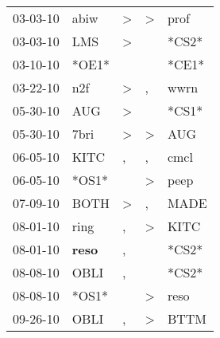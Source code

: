\begin{supertabular}{p{0.07\textwidth}p{0.06\textwidth}p{0.02\textwidth}p{0.02\textwidth}p{0.06\textwidth}}
          03-03-10\textsuperscript{} &           abiw\textsuperscript{} &     \textgreater &     \textgreater &           prof\textsuperscript{} \\
          03-03-10\textsuperscript{} &            LMS\textsuperscript{} &     \textgreater &                  &                            *CS2* \\
          03-10-10\textsuperscript{} &                            *OE1* &                  &                  &                            *CE1* \\
          03-22-10\textsuperscript{} &            n2f\textsuperscript{} &     \textgreater &                , &           wwrn\textsuperscript{} \\
          05-30-10\textsuperscript{} &            AUG\textsuperscript{} &     \textgreater &                  &                            *CS1* \\
          05-30-10\textsuperscript{} &           7bri\textsuperscript{} &     \textgreater &     \textgreater &            AUG\textsuperscript{} \\
          06-05-10\textsuperscript{} &           KITC\textsuperscript{} &                , &                , &           cmcl\textsuperscript{} \\
          06-05-10\textsuperscript{} &                            *OS1* &                  &     \textgreater &           peep\textsuperscript{} \\
          07-09-10\textsuperscript{} &           BOTH\textsuperscript{} &     \textgreater &                , &           MADE\textsuperscript{} \\
          08-01-10\textsuperscript{} &           ring\textsuperscript{} &                , &     \textgreater &           KITC\textsuperscript{} \\
          08-01-10\textsuperscript{} &  \textbf{reso\textsuperscript{}} &                , &                  &                            *CS2* \\
          08-08-10\textsuperscript{} &           OBLI\textsuperscript{} &                , &                  &                            *CS2* \\
          08-08-10\textsuperscript{} &                            *OS1* &                  &     \textgreater &           reso\textsuperscript{} \\
          09-26-10\textsuperscript{} &           OBLI\textsuperscript{} &                , &     \textgreater &           BTTM\textsuperscript{} \\

\end{supertabular}

